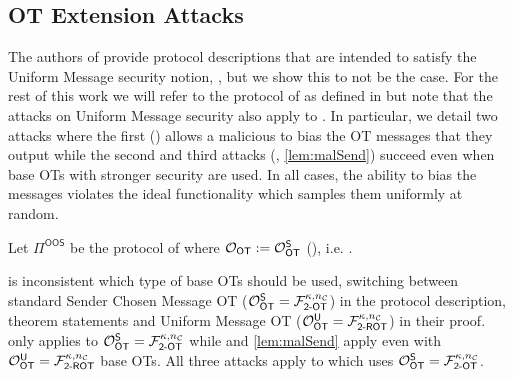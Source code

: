 %			


\subsection{OT Extension Attacks}

The authors of \cite{C:KelOrsSch15,RSA:OrrOrsSch17} provide protocol descriptions that are intended to satisfy the Uniform Message security notion, , but we show this to not be the case. For the rest of this work we will refer to the protocol of \cite{RSA:OrrOrsSch17} as defined in  but note that the attacks on Uniform Message security also apply to \cite[Figure 6, 7]{C:KelOrsSch15}. In particular, we detail two attacks where the first ()  allows a malicious \rec to bias the OT messages that they output while the second and third attacks (, \ref{lem:malSend}) succeed even when base OTs with stronger security are used. In all cases, the ability to bias the messages violates the ideal functionality which samples them uniformly at random.


\begin{definition}\label{def:OOS}
	Let $\Pi^{\textsf{OOS}}$ be the protocol of  where $\mathcal{O}_{\mathsf{OT}}:=\mathcal{O}_{\mathsf{OT}}^\mathsf{S}$ (), i.e.  \cite[Protocol 2]{RSA:OrrOrsSch17}.
\end{definition}
\begin{remark}\label{remark:oosROT}
	\cite{RSA:OrrOrsSch17} is inconsistent which type of base OTs should be used, switching between standard Sender Chosen Message OT ($\mathcal{O}_{\mathsf{OT}}^\mathsf{S}=\mathcal{F}^{\kappa,{n_\mathcal{C}}}_{\textsf{2-OT}}$) in the protocol description, theorem statements and Uniform Message OT ($\mathcal{O}_{\mathsf{OT}}^\mathsf{U}=\mathcal{F}^{\kappa,{n_\mathcal{C}}}_{\textsf{2-ROT}}$) in their proof.  only applies to $\mathcal{O}_{\mathsf{OT}}^\mathsf{S}=\mathcal{F}^{\kappa,{n_\mathcal{C}}}_{\textsf{2-OT}}$ while  and \ref{lem:malSend} apply even with $\mathcal{O}_{\mathsf{OT}}^\mathsf{U}=\mathcal{F}^{\kappa,{n_\mathcal{C}}}_{\textsf{2-ROT}}$ base OTs. All three attacks apply to \cite{C:KelOrsSch15} which uses $\mathcal{O}_{\mathsf{OT}}^\mathsf{S}=\mathcal{F}^{\kappa,{n_\mathcal{C}}}_{\textsf{2-OT}}$.
\end{remark}




